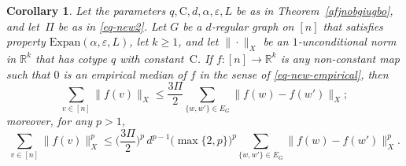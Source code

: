 \documentclass[11pt,leqno]{amsart}
\newtheorem{corollary}[theorem]{Corollary}
\theoremstyle{remark}
\theoremstyle{plain}
\newcommand{\R}{\mathbb{R}}
\begin{document}
\begin{corollary} \label{cor-strong-poincare}
Let the parameters $q,\mathrm{C},d,\alpha,\varepsilon,L$ be as in Theorem~\ref{afjnobgiugbo},
and let\, $\Pi$ be as in \eqref{eq-new2}. Let $G$ be a $d$-regular graph on $[n]$ that satisfies property
$\mathrm{Expan}(\alpha,\varepsilon,L)$, let $k\geqslant 1$, and let $\|\cdot\|_X$ be an $1$-unconditional
norm in $\R^k$ that has cotype $q$ with constant\, $\mathrm{C}$. If $f\colon [n]\to \R^k$ is any non-constant map
such that $0$ is an empirical median of $f$ in the sense of \eqref{eq-new-empirical}, then
\begin{equation} \label{ajhgfvaeiyfvewifywv}
\sum_{v\in[n]}\|f(v)\|_X \leqslant \frac{3\Pi}{2} \sum_{\{w,w'\}\in E_G}\|f(w)-f(w')\|_X;
\end{equation}
moreover, for any $p>1$,
\begin{equation} \label{eq-strong-poincare-p}
\sum_{v\in[n]}\|f(v)\|^p_X \leqslant \Big(\frac{3 \Pi}{2}\Big)^p\, d^{p-1} \big(\max\{2,p\}\big)^p
\sum_{\{w,w'\}\in E_G}\|f(w)-f(w')\|^p_X.
\end{equation}
\end{corollary}
\end{document}
